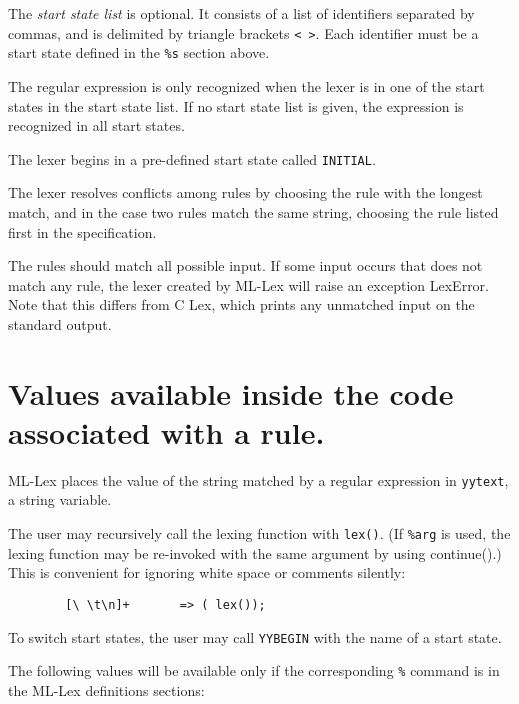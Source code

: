 The {\it start state list} is optional.  It consists of a list of
identifiers separated by commas, and is delimited by triangle
brackets \verb|< >|.  Each identifier must be a start state defined in the
\verb|%s| section above.

The regular expression is only recognized when the lexer is in one of
the start states in the start state list.  If no start state list is
given, the expression is recognized in all start states.

The lexer begins in a pre-defined start state called \verb|INITIAL|.

The lexer resolves conflicts among rules by choosing the rule with
the longest match, and in the case two rules match the same string,
choosing the rule listed first in the specification.

The rules should match all possible input.  If some input occurs that
does not match any rule, the lexer created by ML-Lex will raise an
exception LexError.  Note that this differs from C Lex, which prints
any unmatched input on the standard output.

\section{Values available inside the code associated with a rule.}
\label{avail}

ML-Lex places the value of the string matched by a regular expression
in \verb|yytext|, a string variable.  

The user may recursively
call the lexing function with \verb|lex()|.  (If \verb|%arg| is used, the
lexing function may be re-invoked with the same argument by using
continue().) This is convenient for ignoring white space or comments silently:

\begin{verbatim}
        [\ \t\n]+       => ( lex());
\end{verbatim}

To switch start states, the user may call \verb|YYBEGIN| with the name of a
start state.

The following values will be available only if the corresponding \verb|%|
command is in the ML-Lex definitions sections:

